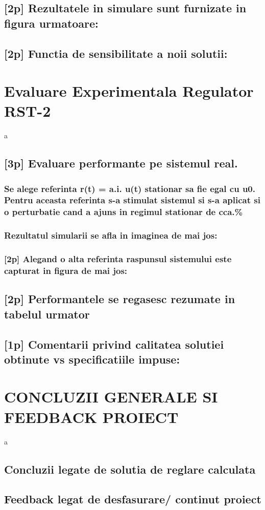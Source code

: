 \documentclass[12pt,english]{article}
\begin{document}
\subsection {[2p] Rezultatele in simulare sunt furnizate in figura urmatoare: }
\subsection {[2p] Functia de sensibilitate a noii solutii: }

\section {Evaluare Experimentala Regulator RST-2 }
a
\subsection {[3p] Evaluare performante pe sistemul real. }
\subsubsection {Se alege referinta r(t) = a.i. u(t) stationar sa fie egal cu u0. Pentru aceasta referinta s-a stimulat sistemul si s-a aplicat si o perturbatie cand a ajuns in regimul stationar de cca.\% }
\subsubsection {Rezultatul simularii se afla in imaginea de mai jos: }
\subsubsection {[2p] Alegand o alta referinta raspunsul sistemului este capturat in figura de mai jos: }
\subsection {[2p] Performantele se regasesc rezumate in tabelul urmator }
\subsection {[1p] Comentarii privind calitatea solutiei obtinute vs specificatiile impuse: }

\section {CONCLUZII GENERALE SI FEEDBACK PROIECT }
a
\subsection {Concluzii legate de solutia de reglare calculata }
\subsection {Feedback legat de desfasurare/ continut proiect }
\end{document}
